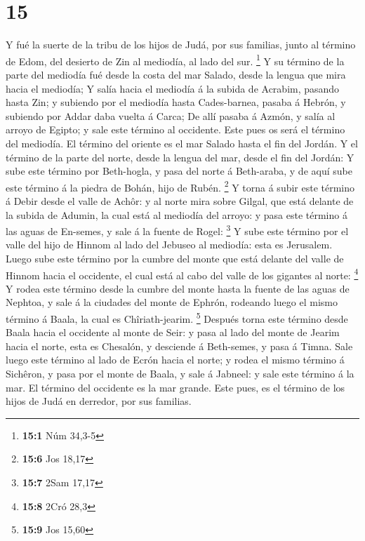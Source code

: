 \hypertarget{section-14}{%
\section{15}\label{section-14}}

 Y fué la suerte de la tribu de los hijos de Judá, por sus
familias, junto al término de Edom, del desierto de Zin al mediodía, al
lado del sur. \footnote{\textbf{15:1} Núm 34,3-5}  Y su
término de la parte del mediodía fué desde la costa del mar Salado,
desde la lengua que mira hacia el mediodía;  Y salía hacia
el mediodía á la subida de Acrabim, pasando hasta Zin; y subiendo por el
mediodía hasta Cades-barnea, pasaba á Hebrón, y subiendo por Addar daba
vuelta á Carca;  De allí pasaba á Azmón, y salía al arroyo
de Egipto; y sale este término al occidente. Este pues os será el
término del mediodía.  El término del oriente es el mar
Salado hasta el fin del Jordán. Y el término de la parte del norte,
desde la lengua del mar, desde el fin del Jordán:  Y sube
este término por Beth-hogla, y pasa del norte á Beth-araba, y de aquí
sube este término á la piedra de Bohán, hijo de Rubén. \footnote{\textbf{15:6}
  Jos 18,17}  Y torna á subir este término á Debir desde el
valle de Achôr: y al norte mira sobre Gilgal, que está delante de la
subida de Adumin, la cual está al mediodía del arroyo: y pasa este
término á las aguas de En-semes, y sale á la fuente de Rogel:
\footnote{\textbf{15:7} 2Sam 17,17}  Y sube este término por
el valle del hijo de Hinnom al lado del Jebuseo al mediodía: esta es
Jerusalem. Luego sube este término por la cumbre del monte que está
delante del valle de Hinnom hacia el occidente, el cual está al cabo del
valle de los gigantes al norte: \footnote{\textbf{15:8} 2Cró 28,3}
 Y rodea este término desde la cumbre del monte hasta la
fuente de las aguas de Nephtoa, y sale á la ciudades del monte de
Ephrón, rodeando luego el mismo término á Baala, la cual es
Chîriath-jearim. \footnote{\textbf{15:9} Jos 15,60} 
Después torna este término desde Baala hacia el occidente al monte de
Seir: y pasa al lado del monte de Jearim hacia el norte, esta es
Chesalón, y desciende á Beth-semes, y pasa á Timna.  Sale
luego este término al lado de Ecrón hacia el norte; y rodea el mismo
término á Sichêron, y pasa por el monte de Baala, y sale á Jabneel: y
sale este término á la mar.  El término del occidente es la
mar grande. Este pues, es el término de los hijos de Judá en derredor,
por sus familias.

